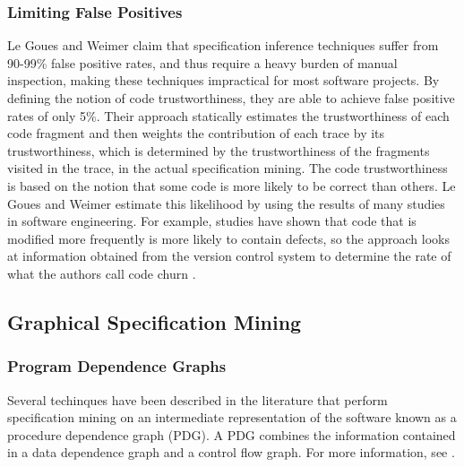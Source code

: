 \documentclass[12pt]{article}
\begin{document}
\subsubsection{Limiting False Positives}
Le Goues and Weimer\cite{Goues:2009:SMF:1532891.1532925} claim that
specification inference techniques suffer from 90-99\% false positive rates,
and thus require a heavy burden of manual inspection, making these techniques
impractical for most software projects. By defining the notion of code
trustworthiness, they are able to achieve false positive rates of only 5\%.
Their approach statically estimates the trustworthiness of each code fragment
and then weights the contribution of each trace by its trustworthiness, which
is determined by the trustworthiness of the fragments visited in the trace, in
the actual specification mining\cite{Goues:2009:SMF:1532891.1532925}. The code
trustworthiness is based on the notion that some code is more likely to be
correct than others. Le Goues and Weimer estimate this likelihood by using the
results of many studies in software engineering. For example, studies have
shown that code that is modified more frequently is more likely to contain
defects, so the approach looks at information obtained from the version control
system to determine the rate of what the authors call code churn
\cite{Goues:2009:SMF:1532891.1532925}.

\subsection{Graphical Specification Mining}
\subsubsection{Program Dependence Graphs}
Several techinques have been described in the literature that perform
specification mining on an intermediate representation of the software known
as a procedure dependence graph (PDG). A PDG combines the information contained
in a data dependence graph and a control flow graph. For more information, see
\cite{Ferrante:1987:PDG:24039.24041}.
\end{document}
